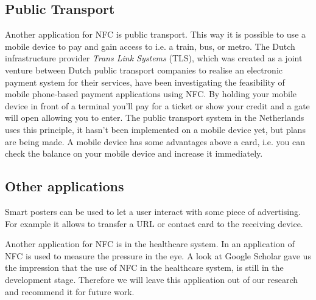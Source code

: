 \subsection{Public Transport}
Another application for NFC is public transport.
This way it is possible to use a mobile device to pay and gain access to i.e. a train, bus, or metro.
The Dutch infrastructure provider \textit{Trans Link Systems} (TLS), which was created as a joint venture between Dutch public transport companies to realise an electronic payment system for their services, have been investigating the feasibility of mobile phone-based payment applications using NFC. %
By holding your mobile device in front of a terminal you'll pay for a ticket or show your credit and a gate will open allowing you to enter.
The public transport system in the Netherlands uses this principle, it hasn't been implemented on a mobile device yet, but plans are being made. A mobile device has some advantages above a card, i.e. you can check the balance on your mobile device and increase it immediately. %

\subsection{Other applications}

Smart posters can be used to let a user interact with some piece of advertising.
For example it allows to transfer a URL or contact card to the receiving device.

Another application for NFC is in the healthcare system.
In \cite{RFIDHB} an application of NFC is used to measure the pressure in the eye.
A look at Google Scholar gave us the impression that the use of NFC in the healthcare system, is still in the development stage.
Therefore we will leave this application out of our research and recommend it for future work. %


